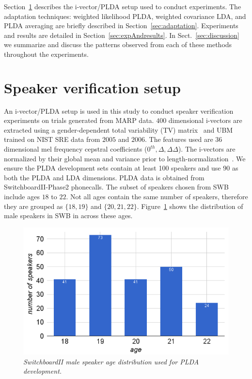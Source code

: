 \documentclass[a4paper]{article}
\begin{document}
Section~\ref{sec:sid} describes the i-vector/PLDA setup used to conduct experiments. The adaptation techniques: weighted likelihood PLDA, weighted covariance LDA, and PLDA averaging are briefly described in Section~\ref{sec:adaptation}. Experiments and results are detailed in Section~\ref{sec:expAndresults}. In Sect.~\ref{sec:discussion} we summarize and discuss the patterns observed from each of these methods throughout the experiments.

\section{Speaker verification setup}
\label{sec:sid}
An i-vector/PLDA setup is used in this study to conduct speaker verification experiments on trials generated from MARP data. $400$ dimensional i-vectors are extracted using a gender-dependent total variability (TV) matrix~\cite{dehak2011front} and UBM trained on NIST SRE data from $2005$ and $2006$. The features used are 36 dimensional mel frequency cepstral coefficients ($0^{th},\Delta, \Delta\Delta$). The i-vectors are normalized by their global mean and variance prior to length-normalization~\cite{garcia2011analysis}. We ensure the PLDA development sets contain at least 100 speakers and use $90$ as both the PLDA and LDA dimensions. PLDA data is obtained from SwitchboardII-Phase2 phonecalls. The subset of speakers chosen from SWB include ages $18$ to $22$. Not all ages contain the same number of speakers, therefore they are grouped as $\{18,19\}$ and $\{20,21,22\}$. Figure~\ref{fig:swb2_male_hist} shows the distribution of male speakers in SWB in across these ages. 

\begin{figure}[h!]
\centering
\includegraphics[width=\linewidth]{figures//swb2_age_hist}
\caption{{\it SwitchboardII male speaker age distribution used for PLDA development.}}
\label{fig:swb2_male_hist}
\end{figure}
\end{document}
